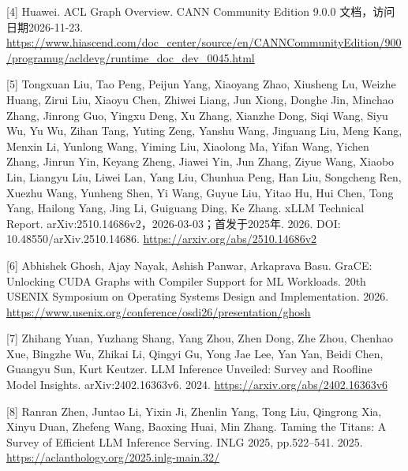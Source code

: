 \documentclass[UTF8,11pt,fontset=windows]{ctexart}
\begin{document}
\leavevmode{}%
{[}4{]} Huawei. ACL Graph Overview. CANN Community Edition 9.0.0 文档，访问日期2026-11-23. \url{https://www.hiascend.com/doc_center/source/en/CANNCommunityEdition/900/programug/acldevg/runtime_doc_dev_0045.html}

\leavevmode{}%
{[}5{]} Tongxuan Liu, Tao Peng, Peijun Yang, Xiaoyang Zhao, Xiusheng Lu, Weizhe Huang, Zirui Liu, Xiaoyu Chen, Zhiwei Liang, Jun Xiong, Donghe Jin, Minchao Zhang, Jinrong Guo, Yingxu Deng, Xu Zhang, Xianzhe Dong, Siqi Wang, Siyu Wu, Yu Wu, Zihan Tang, Yuting Zeng, Yanshu Wang, Jinguang Liu, Meng Kang, Menxin Li, Yunlong Wang, Yiming Liu, Xiaolong Ma, Yifan Wang, Yichen Zhang, Jinrun Yin, Keyang Zheng, Jiawei Yin, Jun Zhang, Ziyue Wang, Xiaobo Lin, Liangyu Liu, Liwei Lan, Yang Liu, Chunhua Peng, Han Liu, Songcheng Ren, Xuezhu Wang, Yunheng Shen, Yi Wang, Guyue Liu, Yitao Hu, Hui Chen, Tong Yang, Hailong Yang, Jing Li, Guiguang Ding, Ke Zhang. xLLM Technical Report. arXiv:2510.14686v2，2026-03-03；首发于2025年. 2026. DOI: 10.48550/arXiv.2510.14686. \url{https://arxiv.org/abs/2510.14686v2}

\leavevmode{}%
{[}6{]} Abhishek Ghosh, Ajay Nayak, Ashish Panwar, Arkaprava Basu. GraCE: Unlocking CUDA Graphs with Compiler Support for ML Workloads. 20th USENIX Symposium on Operating Systems Design and Implementation. 2026. \url{https://www.usenix.org/conference/osdi26/presentation/ghosh}

\leavevmode{}%
{[}7{]} Zhihang Yuan, Yuzhang Shang, Yang Zhou, Zhen Dong, Zhe Zhou, Chenhao Xue, Bingzhe Wu, Zhikai Li, Qingyi Gu, Yong Jae Lee, Yan Yan, Beidi Chen, Guangyu Sun, Kurt Keutzer. LLM Inference Unveiled: Survey and Roofline Model Insights. arXiv:2402.16363v6. 2024. \url{https://arxiv.org/abs/2402.16363v6}

\leavevmode{}%
{[}8{]} Ranran Zhen, Juntao Li, Yixin Ji, Zhenlin Yang, Tong Liu, Qingrong Xia, Xinyu Duan, Zhefeng Wang, Baoxing Huai, Min Zhang. Taming the Titans: A Survey of Efficient LLM Inference Serving. INLG 2025, pp.522--541. 2025. \url{https://aclanthology.org/2025.inlg-main.32/}
\end{document}
